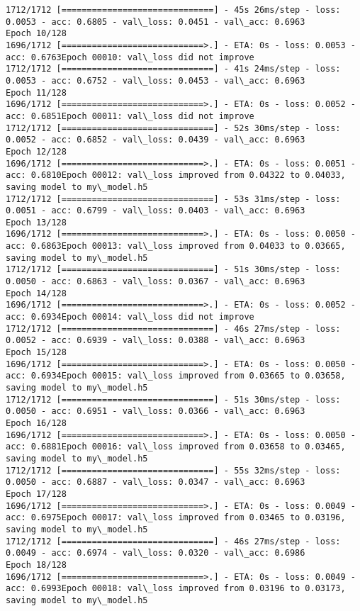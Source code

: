 \documentclass[11pt]{article}
\begin{document}
\begin{Verbatim}[commandchars=\\\{\}]
1712/1712 [==============================] - 45s 26ms/step - loss: 0.0053 - acc: 0.6805 - val\_loss: 0.0451 - val\_acc: 0.6963
Epoch 10/128
1696/1712 [============================>.] - ETA: 0s - loss: 0.0053 - acc: 0.6763Epoch 00010: val\_loss did not improve
1712/1712 [==============================] - 41s 24ms/step - loss: 0.0053 - acc: 0.6752 - val\_loss: 0.0453 - val\_acc: 0.6963
Epoch 11/128
1696/1712 [============================>.] - ETA: 0s - loss: 0.0052 - acc: 0.6851Epoch 00011: val\_loss did not improve
1712/1712 [==============================] - 52s 30ms/step - loss: 0.0052 - acc: 0.6852 - val\_loss: 0.0439 - val\_acc: 0.6963
Epoch 12/128
1696/1712 [============================>.] - ETA: 0s - loss: 0.0051 - acc: 0.6810Epoch 00012: val\_loss improved from 0.04322 to 0.04033, saving model to my\_model.h5
1712/1712 [==============================] - 53s 31ms/step - loss: 0.0051 - acc: 0.6799 - val\_loss: 0.0403 - val\_acc: 0.6963
Epoch 13/128
1696/1712 [============================>.] - ETA: 0s - loss: 0.0050 - acc: 0.6863Epoch 00013: val\_loss improved from 0.04033 to 0.03665, saving model to my\_model.h5
1712/1712 [==============================] - 51s 30ms/step - loss: 0.0050 - acc: 0.6863 - val\_loss: 0.0367 - val\_acc: 0.6963
Epoch 14/128
1696/1712 [============================>.] - ETA: 0s - loss: 0.0052 - acc: 0.6934Epoch 00014: val\_loss did not improve
1712/1712 [==============================] - 46s 27ms/step - loss: 0.0052 - acc: 0.6939 - val\_loss: 0.0388 - val\_acc: 0.6963
Epoch 15/128
1696/1712 [============================>.] - ETA: 0s - loss: 0.0050 - acc: 0.6934Epoch 00015: val\_loss improved from 0.03665 to 0.03658, saving model to my\_model.h5
1712/1712 [==============================] - 51s 30ms/step - loss: 0.0050 - acc: 0.6951 - val\_loss: 0.0366 - val\_acc: 0.6963
Epoch 16/128
1696/1712 [============================>.] - ETA: 0s - loss: 0.0050 - acc: 0.6881Epoch 00016: val\_loss improved from 0.03658 to 0.03465, saving model to my\_model.h5
1712/1712 [==============================] - 55s 32ms/step - loss: 0.0050 - acc: 0.6887 - val\_loss: 0.0347 - val\_acc: 0.6963
Epoch 17/128
1696/1712 [============================>.] - ETA: 0s - loss: 0.0049 - acc: 0.6975Epoch 00017: val\_loss improved from 0.03465 to 0.03196, saving model to my\_model.h5
1712/1712 [==============================] - 46s 27ms/step - loss: 0.0049 - acc: 0.6974 - val\_loss: 0.0320 - val\_acc: 0.6986
Epoch 18/128
1696/1712 [============================>.] - ETA: 0s - loss: 0.0049 - acc: 0.6993Epoch 00018: val\_loss improved from 0.03196 to 0.03173, saving model to my\_model.h5

\end{Verbatim}
\end{document}

